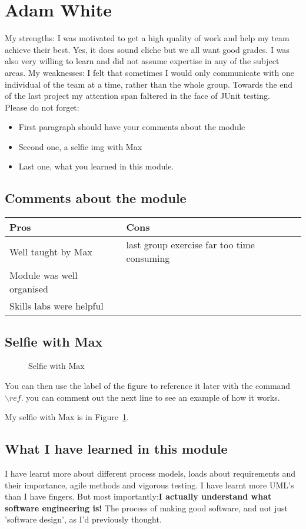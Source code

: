 \section{Adam White}
My strengths: I was motivated to get a high quality of work and help my team achieve their best. Yes, it does sound cliche but we all want good grades. I was 
also very willing to learn and did not assume expertise in any of the subject areas.
My weaknesses: I felt that sometimes I would only communicate with one individual of the team at a time, rather than the whole group. Towards the end of the last project my attention span faltered in the face of JUnit testing. \\

Please do not forget:
\begin{itemize}
	\item First paragraph should have your comments about the module
	\item Second one, a selfie img with Max
	\item Last one, what you learned in this module.
\end{itemize}

\subsection{Comments about the module}
\begin{table}[h]
	\begin{tabular}{|l | l|}
	\hline
	Pros & Cons \\ \hline
	Well taught by Max & last group exercise far too time consuming \\ \hline
	Module was well organised & \\ \hline 
	Skills labs were helpful & \\ \hline
	\end{tabular}
\end{table}

\subsection{Selfie with Max}

\begin{figure}[h]
\caption{Selfie with Max}
\centering
\label{fig:selfie}
\end{figure}

You can then use the label of the figure to reference it later with the command ${\backslash}ref$. you can comment out the next line to see an example of how it works.

My selfie with Max is in  Figure~\ref{fig:selfie}.

\subsection{What I have learned in this module}
I have learnt more about different process models, loads about requirements and their importance, agile methods and vigorous testing. I have learnt more UML's than I have fingers. But most importantly:\textbf{I actually understand what software engineering is!} The process of making good software, and not just 'software design', as I'd previously thought. 
